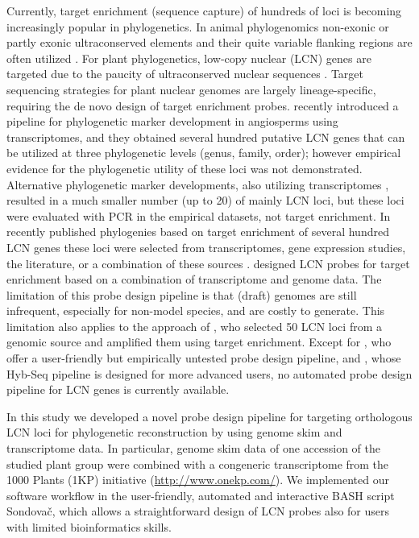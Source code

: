 \documentclass[a4paper, 11pt, twoside]{article}
\begin{document}
Currently, target enrichment (sequence capture) of hundreds of loci is becoming increasingly popular in phylogenetics. In animal phylogenomics non-exonic or partly exonic ultraconserved elements and their quite variable flanking regions are often utilized \citep[e.g.][]{Faircloth2012, Hedtke2013, Smith2014}. For plant phylogenetics, low-copy nuclear (LCN) genes are targeted \citep{Mandel2014, Weitemier2014, Grover2015, Heyduk2015, Mandel2015, Nicholls2015, Stephens2015a, Stephens2015} due to the paucity of ultraconserved nuclear sequences \citep{Reneker2012}. Target sequencing strategies for plant nuclear genomes are largely lineage-specific, requiring the de novo design of target enrichment probes. \citet{Chamala2015a} recently introduced a pipeline for phylogenetic marker development in angiosperms using transcriptomes, and they obtained several hundred putative LCN genes that can be utilized at three phylogenetic levels (genus, family, order); however empirical evidence for the phylogenetic utility of these loci was not demonstrated. Alternative phylogenetic marker developments, also utilizing transcriptomes \citep{Pillon2014, Rothfels2013, Tonnabel2014}, resulted in a much smaller number (up to 20) of mainly LCN loci, but these loci were evaluated with PCR in the empirical datasets, not target enrichment. In recently published phylogenies based on target enrichment of several hundred LCN genes these loci were selected from transcriptomes, gene expression studies, the literature, or a combination of these sources \citep{Mandel2014, Grover2015, Heyduk2015, Mandel2015, Nicholls2015, Stephens2015a, Stephens2015}. \citet{Weitemier2014} designed LCN probes for target enrichment based on a combination of transcriptome and genome data. The limitation of this probe design pipeline is that (draft) genomes are still infrequent, especially for non-model species, and are costly to generate. This limitation also applies to the approach of \citet{DeSousa2014}, who selected 50 LCN loci from a genomic source and amplified them using target enrichment. Except for \citet{Chamala2015a}, who offer a user-friendly but empirically untested probe design pipeline, and \citet{Weitemier2014}, whose Hyb-Seq pipeline is designed for more advanced users, no automated probe design pipeline for LCN genes is currently available.

In this study we developed a novel probe design pipeline for targeting orthologous LCN loci for phylogenetic reconstruction by using genome skim and transcriptome data. In particular, genome skim data of one accession of the studied plant group were combined with a congeneric transcriptome from the 1000 Plants (1KP) initiative (\href{http://www.onekp.com/}{http://www.onekp.com/}). We implemented our software workflow in the user-friendly, automated and interactive BASH script Sondovač, which allows a straightforward design of LCN probes also for users with limited bioinformatics skills.
\end{document}
